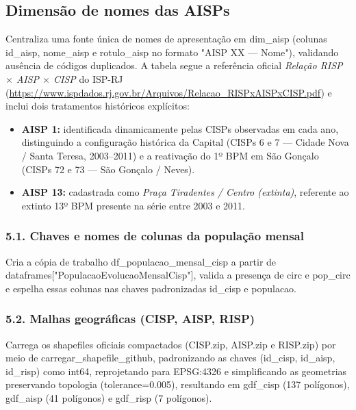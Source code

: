 \documentclass[11pt,a4paper]{article}
\newcommand{\code}[1]{{\ttfamily\footnotesize\allowbreak #1}}
\begin{document}
\subsection{Dimensão de nomes das AISPs}
Centraliza uma fonte única de nomes de apresentação em \code{dim\_aisp} (colunas \code{id\_aisp}, \code{nome\_aisp} e \code{rotulo\_aisp} no formato \code{"AISP XX --- Nome"}), validando ausência de códigos duplicados. A tabela segue a referência oficial \textit{Relação RISP $\times$ AISP $\times$ CISP} do ISP-RJ (\url{https://www.ispdados.rj.gov.br/Arquivos/Relacao_RISPxAISPxCISP.pdf}) e inclui dois tratamentos históricos explícitos:
\begin{itemize}
  \setlength{\itemsep}{2pt}\setlength{\parskip}{0pt}
  \item \textbf{AISP 1:} identificada dinamicamente pelas CISPs observadas em cada ano, distinguindo a configuração histórica da Capital (CISPs 6 e 7 --- Cidade Nova / Santa Teresa, 2003--2011) e a reativação do 1º BPM em São Gonçalo (CISPs 72 e 73 --- São Gonçalo / Neves).
  \item \textbf{AISP 13:} cadastrada como \textit{Praça Tiradentes / Centro (extinta)}, referente ao extinto 13º BPM presente na série entre 2003 e 2011.
\end{itemize}

\subsubsection*{5.1. Chaves e nomes de colunas da população mensal}
Cria a cópia de trabalho \code{df\_populacao\_mensal\_cisp} a partir de \code{dataframes["PopulacaoEvolucaoMensalCisp"]}, valida a presença de \code{circ} e \code{pop\_circ} e espelha essas colunas nas chaves padronizadas \code{id\_cisp} e \code{populacao}.

\subsubsection*{5.2. Malhas geográficas (CISP, AISP, RISP)}
Carrega os shapefiles oficiais compactados (\code{CISP.zip}, \code{AISP.zip} e \code{RISP.zip}) por meio de \code{carregar\_shapefile\_github}, padronizando as chaves (\code{id\_cisp}, \code{id\_aisp}, \code{id\_risp}) como \code{int64}, reprojetando para \code{EPSG:4326} e simplificando as geometrias preservando topologia (\code{tolerance=0.005}), resultando em \code{gdf\_cisp} (137 polígonos), \code{gdf\_aisp} (41 polígonos) e \code{gdf\_risp} (7 polígonos).
\end{document}
